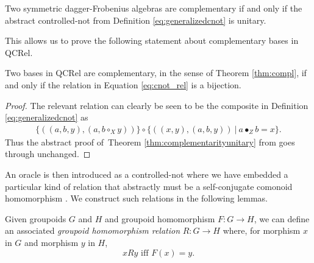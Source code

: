 \begin{theorem}
\label{thm:complementarityunitary}
  Two symmetric dagger-Frobenius algebras are complementary if and only if the abstract controlled-not from Definition \ref{eq:generalizedcnot} is unitary.
\end{theorem}

\noindent This allows us to prove the following statement about  complementary bases in QCRel.
\begin{theorem}
Two bases in QCRel are complementary, in the sense of Theorem \ref{thm:compl}, if and only if the relation in Equation \ref{eq:cnot_rel} is a bijection.
\end{theorem}
\begin{proof}
The relevant relation can clearly be seen to be the composite in Definition \ref{eq:generalizedcnot} as
\begin{align}
\{((a,b,y),(a,b\circ_Xy))\} \circ \{((x,y),(a,b,y))~|~a\bullet_Zb=x\}.
\end{align}
Thus the abstract proof of\ Theorem \ref{thm:complementarityunitary} from \cite{zeng-unitary} goes through unchanged.
\end{proof}

An oracle is then introduced as a controlled-not where we have embedded a particular kind of relation that abstractly must be a self-conjugate comonoid homomorphism \cite{zeng-unitary} . We construct such relations in the following lemmas.

\begin{defn}
Given groupoids $G$ and $H$ and groupoid homomorphism $F:G\to H$, we can define an associated \emph{groupoid homomorphism relation} $R:G\to H$ where, for morphism $x$ in $G$ and morphism $y$ in $H$,
$$
xRy \mbox{ iff }F(x) = y.
$$
\end{defn}

